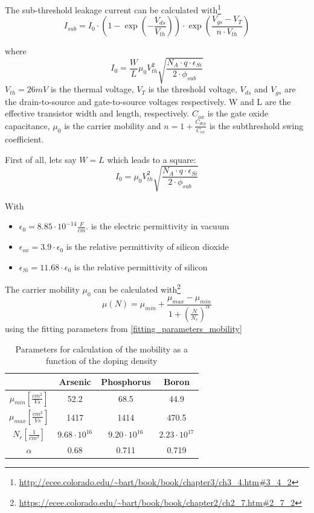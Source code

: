 The sub-threshold leakage current can be calculated with\footnote{\url{http://ecee.colorado.edu/\~bart/book/book/chapter3/ch3_4.htm\#3_4_2}}
\begin{equation}
I_{sub}
=
I_0
\cdot
\left(1-\exp\left(-\frac{V_{ds}}{V_{th}}\right)\right)
\cdot
\exp\left(\frac{V_{gs}-V_{T}}{n \cdot V_{th}}\right)
\end{equation}

where
\begin{equation}
I_0 = \frac{W}{L} \mu_0 V_{th}^2 \sqrt{\frac{N_A \cdot q \cdot \epsilon_{Si}}{2 \cdot \phi_{sub}}}
\end{equation}
$V_{th}=26mV$ is the thermal voltage, $V_T$ is the threshold voltage, $V_{ds}$ and $V_{gs}$ are the drain-to-source and gate-to-source voltages respectively.
W and L are the effective transistor width and length, respectively. $C_{ox}$ is the gate oxide capacitance, $\mu_0$ is the carrier mobility and $n=1+\frac{C_{dep}}{C_{ox}}$ is the subthreshold swing coefficient.

First of all, lets say $W=L$ which leads to a square:
\begin{equation}
I_0 = \mu_0 V_{th}^2 \sqrt{\frac{N_A \cdot q \cdot \epsilon_{Si}}{2 \cdot \phi_{sub}}}
\end{equation}

With
\begin{itemize}
\item $\epsilon_0 = 8.85 \cdot 10^{-14}\frac{F}{cm}. $ is the electric permittivity in vacuum
\item $\epsilon_{ox} =3.9 \cdot \epsilon_0$ is the relative permittivity of silicon dioxide
\item $\epsilon_{Si} =11.68 \cdot \epsilon_0$ is the relative permittivity of silicon
\end{itemize}

The carrier mobility $ \mu_0$ can be calculated with\footnote{\url{https://ecee.colorado.edu/\~bart/book/book/chapter2/ch2_7.htm\#2_7_2}}
\begin{equation}
 \mu(N) =  \mu_{min} + \frac{ \mu_{max}- \mu_{min}}{1+\left(\frac{N}{N_r}\right)^\alpha}
\end{equation}
using the fitting parameters from \autoref{fitting_parameters_mobility}

\begin{table}[H]
	\centering
	\begin{tabular}{|c|c|c|c|}
		\hline
		{} &
		\textbf{Arsenic} &	
		\textbf{Phosphorus} &
		\textbf{Boron} \\
		\hline
		$\mu_{min} [\frac{cm^2}{Vs}]$ &
		52.2 &
		68.5 &		
		44.9 \\
		\hline
		$\mu_{max} [\frac{cm^2}{Vs}]$ &
		1417 &
		1414 &
		470.5 \\
		\hline
		$N_r [\frac{1}{cm^3}]$ &
		$9.68 \cdot 10^{16}$ &
		$9.20 \cdot 10^{16}$ &
		$2.23 \cdot 10^{17}$ \\
		\hline
		$\alpha$ &
		0.68 &
		0.711 &
		0.719 \\
		\hline
	\end{tabular}
	\caption{Parameters for calculation of the mobility as a function of the doping density}
	\label{fitting_parameters_mobility}
\end{table}

